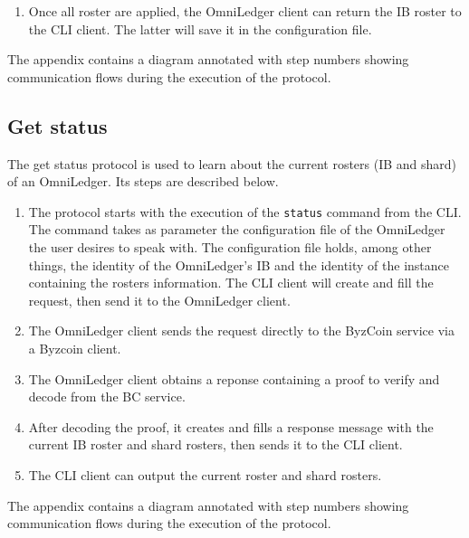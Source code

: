 \begin{enumerate}
	\item Once all roster are applied, the OmniLedger client can return the IB roster to the CLI client. The latter will save it in the configuration file.
\end{enumerate}
The appendix contains a diagram annotated with step numbers showing communication flows during the execution of the protocol. 

\subsection{Get status}
The get status protocol is used to learn about the current rosters (IB and shard) of an OmniLedger. Its steps are described below. 
\begin{enumerate}
	\item The protocol starts with the execution of the \texttt{status} command from the CLI. The command takes as parameter the configuration file of the OmniLedger the user desires to speak with. The configuration file holds, among other things, the identity of the OmniLedger's IB and the identity of the instance containing the rosters information. The CLI client will create and fill the request, then send it to the OmniLedger client. 
	
	\item The OmniLedger client sends the request directly to the ByzCoin service via a Byzcoin client. 
	
	 \item The OmniLedger client obtains a reponse containing a proof to verify and decode from the BC service. 
	 
	 \item After decoding the proof, it creates and fills a response message with the current IB roster and shard rosters, then sends it to the CLI client. 
	
	\item The CLI client can output the current roster and shard rosters.
\end{enumerate}
The appendix contains a diagram annotated with step numbers showing communication flows during the execution of the protocol. 

